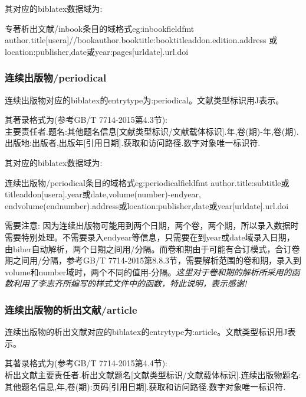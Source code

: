 其对应的biblatex数据域为:
\begin{codetex}{专著析出文献/inbook条目的域格式}{eg:inbookfieldfmt}
author.title[usera]//bookauthor.booktitle:booktitleaddon.edition.address 或location:publisher,date或year:pages[urldate].url.doi
\end{codetex}

\subsubsection{连续出版物/periodical}
\begin{refentry}{}{}
连续出版物对应的biblatex的entrytype为:periodical。文献类型标识用J表示。

其著录格式为(参考GB/T 7714-2015第4.3节):\\
主要责任者.题名:其他题名信息[文献类型标识/文献载体标识].年,卷(期)-年,卷(期).出版地:出版者,出版年[引用日期].获取和访问路径.数字对象唯一标识符.
\end{refentry}

其对应的biblatex数据域为:
\begin{codetex}{连续出版物/periodical条目的域格式}{eg:periodicalfieldfmt}
author.title:subtitle或titleaddon[usera].year或date,volume(number)-endyear, endvolume(endnumber).address或location:publisher,date或year[urldate].url.doi
\end{codetex}

需要注意: 因为连续出版物可能用到两个日期，两个卷，两个期，所以录入数据时需要特别处理。不需要录入endyear等信息，只需要在到year或date域录入日期，由biber自动解析，两个日期之间用/分隔。而卷和期由于可能有合订模式，合订卷期之间用/分隔，参考GB/T 7714-2015第8.8.3节，需要解析范围的卷和期，录入到volume和number域时，两个不同的值用-分隔。\emph{这里对于卷和期的解析所采用的函数利用了李志齐所编写的样式文件中的函数，特此说明，表示感谢!}

\subsubsection{连续出版物的析出文献/article}
\begin{refentry}{}{}
连续出版物的析出文献对应的biblatex的entrytype为:article。文献类型标识用J表示。

其著录格式为(参考GB/T 7714-2015第4.4节):\\
析出文献主要责任者.析出文献题名[文献类型标识/文献载体标识].连续出版物题名:其他题名信息,年,卷(期):页码[引用日期].获取和访问路径.数字对象唯一标识符.
\end{refentry}

